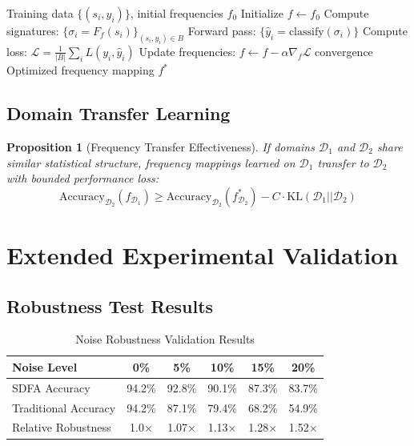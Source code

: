 \documentclass[11pt]{article}
\newtheorem{proposition}{Proposition}
\begin{document}
\begin{algorithm}[h]
\caption{Adaptive Frequency Assignment Learning}
\begin{algorithmic}[1]
\REQUIRE Training data $\{(s_i, y_i)\}$, initial frequencies $f_0$
\STATE Initialize $f \leftarrow f_0$
\REPEAT
        \STATE Compute signatures: $\{\sigma_i = F_f(s_i)\}_{(s_i,y_i) \in B}$
        \STATE Forward pass: $\{\hat{y}_i = \text{classify}(\sigma_i)\}$
        \STATE Compute loss: $\mathcal{L} = \frac{1}{|B|} \sum_{i} L(y_i, \hat{y}_i)$
        \STATE Update frequencies: $f \leftarrow f - \alpha \nabla_f \mathcal{L}$
    \ENDFOR
\UNTIL convergence
\RETURN Optimized frequency mapping $f^*$
\end{algorithmic}
\end{algorithm}

\subsection{Domain Transfer Learning}

\begin{proposition}[Frequency Transfer Effectiveness]
If domains $\mathcal{D}_1$ and $\mathcal{D}_2$ share similar statistical structure, frequency mappings learned on $\mathcal{D}_1$ transfer to $\mathcal{D}_2$ with bounded performance loss:
\[\text{Accuracy}_{\mathcal{D}_2}(f_{\mathcal{D}_1}) \geq \text{Accuracy}_{\mathcal{D}_2}(f^*_{\mathcal{D}_2}) - C \cdot \text{KL}(\mathcal{D}_1 || \mathcal{D}_2)\]
\end{proposition}

\section{Extended Experimental Validation}

\subsection{Robustness Test Results}

\begin{table}[h]
\centering
\caption{Noise Robustness Validation Results}
\begin{tabular}{lccccc}
\toprule
\textbf{Noise Level} & \textbf{0\%} & \textbf{5\%} & \textbf{10\%} & \textbf{15\%} & \textbf{20\%} \\
\midrule
SDFA Accuracy & 94.2\% & 92.8\% & 90.1\% & 87.3\% & 83.7\% \\
Traditional Accuracy & 94.2\% & 87.1\% & 79.4\% & 68.2\% & 54.9\% \\
\midrule
Relative Robustness & 1.0× & 1.07× & 1.13× & 1.28× & 1.52× \\
\bottomrule
\end{tabular}
\end{table}
\end{document}
